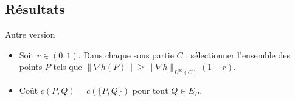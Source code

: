 \documentclass[11pt]{beamer}
\begin{document}
\subsection{Résultats}
\begin{frame}{Autre version}
\begin{center}
\end{center}




\begin{itemize}
\item Soit $r\in (0,1)$. Dans chaque sous partie $C$ , sélectionner l'ensemble des points $P$ tels que $\|\nabla h(P)\|\geq \|\nabla h\|_{\mathit{L}^\infty(C)}(1-r)$.
\item Coût $c(P,Q)=c(\{P,Q\})$ pour tout $Q\in E_P$.
\end{itemize}
\end{frame}
\end{document}
